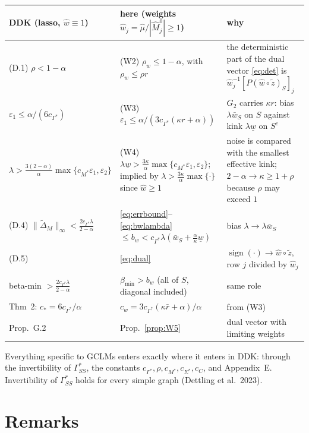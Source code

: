 \documentclass[11pt,a4paper]{article}
\numberwithin{equation}{section}
\theoremstyle{plain}
\theoremstyle{remark}
\DeclareMathOperator{\sign}{sign}
\begin{document}
{\small
\renewcommand{\arraystretch}{1.6}
\noindent\begin{tabularx}{\textwidth}{>{\raggedright\arraybackslash}p{}>{\raggedright\arraybackslash}p{}>{\raggedright\arraybackslash}X}
\toprule
DDK (lasso, $\hat w\equiv1$) & here (weights $\hat w_j=\hat\mu/|\hat M^0_j|\ge1$) & why\\
\midrule
(D.1) $\rho<1-\alpha$
& (W2) $\rho_w\le1-\alpha$, with $\rho_w\le\rho r$
& the deterministic part of the dual vector \eqref{eq:det} is $\hat w_j^{-1}[P(\hat w\circ\tilde z)_S]_j$\\
$\varepsilon_1\le\alpha/(6c_{\Gamma^*})$
& (W3) $\varepsilon_1\le\alpha/(3c_{\Gamma^*}(\kappa r+\alpha))$
& $G_2$ carries $\kappa r$: bias $\lambda\bar w_S$ on $S$ against kink $\lambda\underline w$ on $S^c$\\
$\lambda>\frac{3(2-\alpha)}{\alpha}\max\{c_{M^*}\varepsilon_1,\varepsilon_2\}$
& (W4) $\lambda\underline w>\frac{3\kappa}{\alpha}\max\{c_{M^*}\varepsilon_1,\varepsilon_2\}$; implied by $\lambda>\frac{3\kappa}{\alpha}\max\{\cdot\}$ since $\hat w\ge1$
& noise is compared with the smallest effective kink; $2-\alpha\to\kappa\ge1+\rho$ because $\rho$ may exceed $1$\\
(D.4) $\|\tilde\Delta_M\|_\infty<\frac{2c_{\Gamma^*}\lambda}{2-\alpha}$
& \eqref{eq:errbound}--\eqref{eq:bwlambda} $\le b_w<c_{\Gamma^*}\lambda(\bar w_S+\frac\alpha\kappa\underline w)$
& bias $\lambda\to\lambda\bar w_S$\\
(D.5)
& \eqref{eq:dual}
& $\sign(\cdot)\to\hat w\circ\tilde z$, row $j$ divided by $\hat w_j$\\
beta-min $>\frac{2c_{\Gamma^*}\lambda}{2-\alpha}$
& $\beta_{\min}>b_w$ (all of $S$, diagonal included)
& same role\\
Thm~2: $c_*=6c_{\Gamma^*}/\alpha$
& $c_w=3c_{\Gamma^*}(\kappa\bar r+\alpha)/\alpha$
& from (W3)\\
Prop.~G.2
& Prop.~\ref{prop:W5}
& dual vector with limiting weights\\
\bottomrule
\end{tabularx}}

\medskip
Everything specific to GCLMs enters exactly where it enters in DDK: through the invertibility of $\Gamma^*_{SS}$, the constants $c_{\Gamma^*},\rho,c_{M^*},c_{\Sigma^*},c_C$, and Appendix~E. Invertibility of $\Gamma^*_{SS}$ holds for every simple graph (Dettling et al.\ 2023).

\section{Remarks}\label{sec:remarks}
\end{document}
